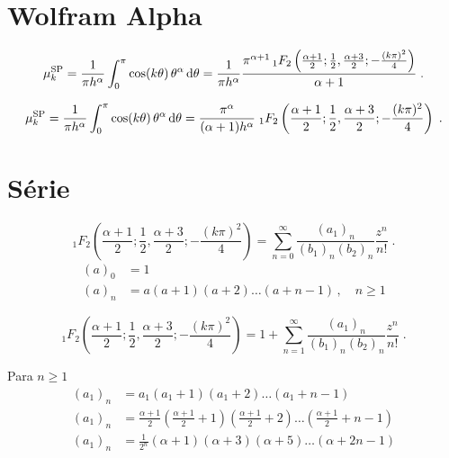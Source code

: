\documentclass[10pt,a4paper]{article}%
\newcommand{\dx}[1][x]{\mathrm{d}{#1}}
\begin{document}
\section{Wolfram Alpha}

\begin{equation}
  \mu_k^{\text{SP}}
  = \frac{1}{\pi h^\alpha} \int_0^\pi \cos(k\theta)\, \theta^\alpha  \, \dx[\theta] \\
  = \frac{1}{\pi h^\alpha} \frac{\pi^{\alpha+1} \,{}_1F_2\left(\frac{\alpha+1}{2};\frac{1}{2},\frac{\alpha+3}{2};-\frac{(k\pi)^2}{4}\right)}{\alpha+1}
  \;.
\end{equation}

\begin{equation}
  \mu_k^{\text{SP}}
  = \frac{1}{\pi h^\alpha} \int_0^\pi \cos(k\theta)\, \theta^\alpha  \, \dx[\theta] \\
  = \frac{\pi^\alpha}{(\alpha+1)h^\alpha}\; {}_1F_2\left(\frac{\alpha+1}{2};\frac{1}{2},\frac{\alpha+3}{2};-\frac{(k\pi)^2}{4}\right)
  \;.
\end{equation}

\section{Série}
\begin{equation}
  {}_1F_2\left(\frac{\alpha+1}{2};\frac{1}{2},\frac{\alpha+3}{2};-\frac{(k\pi)^2}{4}\right)
  =\sum_{n=0}^{\infty} \frac{(a_1)_n}{(b_1)_n(b_2)_n}
   \frac{z^n}{n!}
  \;.
\end{equation}
\begin{equation}
\begin{split}
(a)_0 &= 1 \\
(a)_n &= a\left(a+1\right)\left(a+2\right)\ldots\left(a+n-1\right)\,,\quad n\geq 1
\end{split}
\end{equation}

\begin{equation}
  {}_1F_2\left(\frac{\alpha+1}{2};\frac{1}{2},\frac{\alpha+3}{2};-\frac{(k\pi)^2}{4}\right)
  =1 + \sum_{n=1}^{\infty} \frac{(a_1)_n}{(b_1)_n(b_2)_n}
   \frac{z^n}{n!}
  \;.
\end{equation}

Para $n \geq 1$
\begin{equation}
\begin{split}
(a_1)_n &= a_1\left(a_1+1\right)\left(a_1+2\right)\ldots\left(a_1+n-1\right) \\
(a_1)_n &= \frac{\alpha+1}{2}\left(\frac{\alpha+1}{2}+1\right)\left(\frac{\alpha+1}{2}+2\right)\ldots\left(\frac{\alpha+1}{2}+n-1\right) \\
(a_1)_n &= \frac{1}{2^n}\left(\alpha+1\right)\left(\alpha+3\right)\left(\alpha+5\right)\ldots\left(\alpha+2n-1\right) \\
\end{split}
\end{equation}
\end{document}
